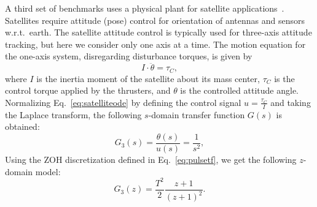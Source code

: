 \documentclass[final]{sig-alternate-05-2015}
\begin{document}
A third set of benchmarks uses a physical plant for satellite
applications~\cite{Franklin15}.  Satellites require attitude (pose) control
for orientation of antennas and sensors w.r.t.~earth.  The satellite
attitude control is typically used for three-axis attitude tracking, but
here we consider only one axis at a time.  The motion equation for the
one-axis system, disregarding disturbance torques, is given by
%
\begin{equation}
\label{eq:satelliteode}
I\cdot \ddot{\theta} = \tau_{C}, 
\end{equation}
%
\noindent where $I$ is the inertia moment of the satellite about its mass
center, $\tau_{C}$ is the control torque applied by the thrusters, and
$\theta$ is the controlled attitude angle.  Normalizing
Eq.~\eqref{eq:satelliteode} by defining the control signal
$u=\frac{\tau_{C}}{I}$ and taking the Laplace transform, the following
$s$-domain transfer function $G(s)$ is obtained:
%
\begin{equation}
\label{eq:satellitetf}
G_{3}(s)=\frac{\theta(s)}{u(s)}=\frac{1}{s^2},
\end{equation}
%
\noindent Using the ZOH discretization defined in Eq.~\eqref{eq:pulsetf}, 
we get the following $z$-domain model:
%
\begin{equation}
G_{3}(z)= \frac{T^{2}}{2} \frac{z+1}{(z+1)^{2}}. \nonumber
\end{equation}

%
%
\end{document}
